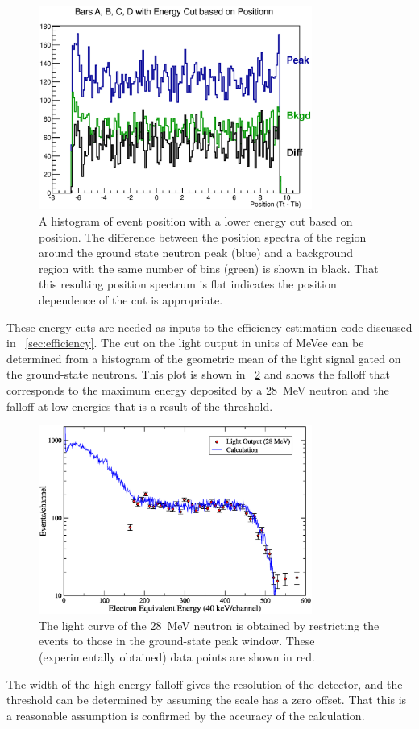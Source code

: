 \begin{figure}[!htbp]
\centering
\includegraphics[width=0.8\textwidth]{figures/PositionSpectrum.eps}
\caption{A histogram of event position with a lower energy cut based on position.  The difference between the position spectra of the region around the ground state neutron peak (blue) and a background region with the same number of bins (green) is shown in black.  That this resulting position spectrum is flat indicates the position dependence of the cut is appropriate.}
\label{fig:flatPositionSpectrum}
\end{figure}

These energy cuts are needed as inputs to the efficiency estimation code discussed in {\sect}~\ref{sec:efficiency}.  The cut on the light output in units of MeVee can be determined from a histogram of the geometric mean of the light signal gated on the ground-state neutrons.  This plot is shown in {\fig}~\ref{fig:lowEnergyCut} and shows the falloff that corresponds to the maximum energy deposited by a 28~MeV neutron and the falloff at low energies that is a result of the threshold.  
\begin{figure}[!htbp]
\centering
\includegraphics[width=0.8\textwidth]{figures/Lite_28MeV.eps}
\caption{The light curve of the 28~MeV neutron is obtained by restricting the events to those in the ground-state peak window.  These (experimentally obtained) data points are shown in red.}
\label{fig:lowEnergyCut}
\end{figure}
The width of the high-energy falloff gives the resolution of the detector, and the threshold can be determined by assuming the scale has a zero offset.  That this is a reasonable assumption is confirmed by the accuracy of the calculation.  

